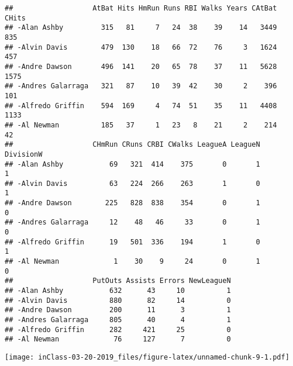 \documentclass[]{article}
\newenvironment{Shaded}{\begin{snugshade}}{\end{snugshade}}
\newcommand{\KeywordTok}[1]{\textcolor[rgb]{0.13,0.29,0.53}{\textbf{{#1}}}}
\newcommand{\DataTypeTok}[1]{\textcolor[rgb]{0.13,0.29,0.53}{{#1}}}
\newcommand{\DecValTok}[1]{\textcolor[rgb]{0.00,0.00,0.81}{{#1}}}
\newcommand{\StringTok}[1]{\textcolor[rgb]{0.31,0.60,0.02}{{#1}}}
\newcommand{\CommentTok}[1]{\textcolor[rgb]{0.56,0.35,0.01}{\textit{{#1}}}}
\newcommand{\NormalTok}[1]{{#1}}
\begin{document}
\begin{verbatim}
##                   AtBat Hits HmRun Runs RBI Walks Years CAtBat CHits
## -Alan Ashby         315   81     7   24  38    39    14   3449   835
## -Alvin Davis        479  130    18   66  72    76     3   1624   457
## -Andre Dawson       496  141    20   65  78    37    11   5628  1575
## -Andres Galarraga   321   87    10   39  42    30     2    396   101
## -Alfredo Griffin    594  169     4   74  51    35    11   4408  1133
## -Al Newman          185   37     1   23   8    21     2    214    42
##                   CHmRun CRuns CRBI CWalks LeagueA LeagueN DivisionW
## -Alan Ashby           69   321  414    375       0       1         1
## -Alvin Davis          63   224  266    263       1       0         1
## -Andre Dawson        225   828  838    354       0       1         0
## -Andres Galarraga     12    48   46     33       0       1         0
## -Alfredo Griffin      19   501  336    194       1       0         1
## -Al Newman             1    30    9     24       0       1         0
##                   PutOuts Assists Errors NewLeagueN
## -Alan Ashby           632      43     10          1
## -Alvin Davis          880      82     14          0
## -Andre Dawson         200      11      3          1
## -Andres Galarraga     805      40      4          1
## -Alfredo Griffin      282     421     25          0
## -Al Newman             76     127      7          0
\end{verbatim}

\begin{Shaded}
\end{Shaded}

\texttt{[image: inClass-03-20-2019\_files/figure-latex/unnamed-chunk-9-1.pdf]}
\end{document}
